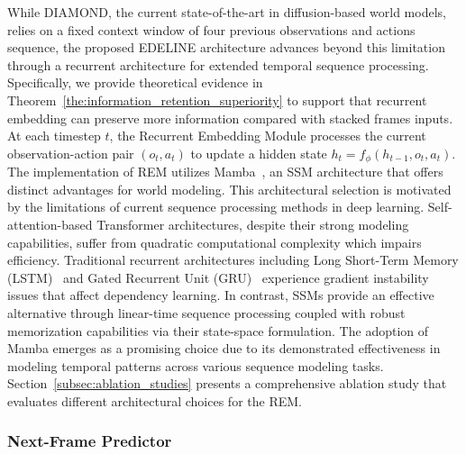 While DIAMOND, the current state-of-the-art in diffusion-based world models, relies on a fixed context window of four previous observations and actions sequence, the proposed EDELINE architecture advances beyond this limitation through a recurrent architecture for extended temporal sequence processing. Specifically, we provide theoretical evidence in Theorem~\ref{the:information_retention_superiority} to support that recurrent embedding can preserve more information compared with stacked frames inputs. At each timestep $t$, the Recurrent Embedding Module processes the current observation-action pair $(o_t, a_t)$ to update a hidden state $h_t = f_\phi(h_{t-1}, o_t, a_t)$.
The implementation of REM utilizes Mamba~\cite{gu2024mamba}, an SSM architecture that offers distinct advantages for world modeling. This architectural selection is motivated by the limitations of current sequence processing methods in deep learning. Self-attention-based Transformer architectures, despite their strong modeling capabilities, suffer from quadratic computational complexity which impairs efficiency. Traditional recurrent architectures including Long Short-Term Memory (LSTM)~\cite{HochSchm97} and Gated Recurrent Unit (GRU)~\cite{69e088c8129341ac89810907fe6b1bfe} experience gradient instability issues that affect dependency learning. In contrast, SSMs provide an effective alternative through linear-time sequence processing coupled with robust memorization capabilities via their state-space formulation. The adoption of Mamba emerges as a promising choice due to its demonstrated effectiveness in modeling temporal patterns across various sequence modeling tasks. Section~\ref{subsec:ablation_studies} presents a comprehensive ablation study that evaluates different architectural choices for the REM.

\subsubsection{Next-Frame Predictor}


